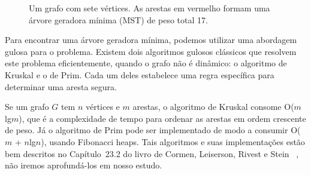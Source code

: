 \begin{figure}
    \centering
    \caption{Um grafo com sete vértices. As arestas em vermelho formam uma árvore geradora mínima (MST) de peso total 17.}
    \label{fig:mst_example}
\end{figure}

Para encontrar uma árvore geradora mínima, podemos utilizar uma abordagem gulosa para o problema. Existem dois algoritmos gulosos clássicos que resolvem este problema eficientemente, quando o grafo não é dinâmico: o algoritmo de Kruskal e o de Prim. Cada um deles estabelece uma regra específica para determinar uma aresta segura.

Se um grafo $G$ tem $n$ vértices e $m$ arestas, o algoritmo de Kruskal consome O($m$lg$m$), que é a complexidade de tempo para ordenar as arestas em ordem crescente de peso. Já o algoritmo de Prim pode ser implementado de modo a consumir O($m$ + $n$lg$n$), usando Fibonacci heaps. Tais algoritmos e suas implementações estão bem descritos no Capítulo~23.2 do livro de Cormen, Leiserson, Rivest e Stein ~\cite{clrs}, não iremos aprofundá-los em nosso estudo. 

